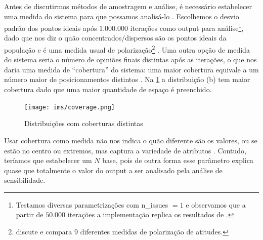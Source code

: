     Antes de discutirmos métodos de amostragem e análise, é necessário
    estabelecer uma medida do sistema para que possamos analisá-lo
    \cite{railsback2012agent}. Escolhemos o desvio padrão dos pontos ideais após
    \(1.000.000\) iterações como output para análise\footnote{Testamos diversas
      parametrizações com n\_issues \(= 1\) e observamos que a partir de
      \(50.000\) iterações a implementação replica os resultados de
      .}, dado que nos diz o quão
    concentrados/dispersos são os pontos ideais da população e é uma medida
    usual de polarização\footnote{ discute
      e compara 9 diferentes medidas de polarização de atitudes.}
    \cite{bramson2016disambiguation}. Uma outra opção de medida do sistema seria
    o número de opiniões finais distintas após as iterações, o que nos daria uma
    medida de ``cobertura'' do sistema: uma maior cobertura equivale a um número
    maior de posicionamentos distintos \cite{bramson2016disambiguation}. Na
    \ref{fig:coverage} a distribuição (b) tem maior cobertura dado que uma maior
    quantidade de espaço é preenchido.
    
    \begin{figure}[H]
      \centering
      \texttt{[image: ims/coverage.png]}
      \caption{Distribuições com coberturas distintas}
      \label{fig:coverage}
    \end{figure}

    
    Usar cobertura como medida não nos indica
    o quão diferente são os valores, ou se estão no centro ou extremos, mas
    captura a variedade de atributos \cite[p.85]{bramson2016disambiguation}.
    Contudo, teríamos que estabelecer um \(N\) base, pois de outra forma esse
    parâmetro explica quase que totalmente o valor do output a ser analisado
    pela análise de sensibilidade.
    
